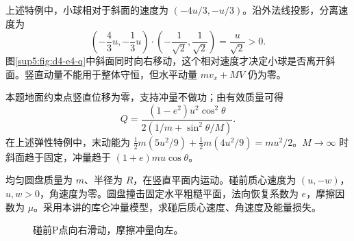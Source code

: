 \begin{solution}
上述特例中，小球相对于斜面的速度为 $(-4u/3,-u/3)$。沿外法线投影，分离速度为
\[
\left(-\frac43u,-\frac13u\right)\cdot
\left(-\frac1{\sqrt2},\frac1{\sqrt2}\right)=\frac u{\sqrt2}>0.
\]
图\ref{sup5:fig:d4-e4-q}中斜面同时向右移动，这个相对速度才决定小球是否离开斜面。竖直动量不能用于整体守恒，但水平动量 $mv_x+MV$ 仍为零。

本题地面约束点竖直位移为零，支持冲量不做功；由有效质量可得
\begin{equation}
 Q=\frac{(1-e^2)u^2\cos^2\theta}{2(1/m+\sin^2\theta/M)}.
\end{equation}
在上述弹性特例中，末动能为 $\tfrac12m(5u^2/9)+\tfrac12m(4u^2/9)=mu^2/2$。$M\to\infty$ 时斜面趋于固定，冲量趋于 $(1+e)mu\cos\theta$。
\end{solution}



\begin{example}[滑动终止的冲量条件]\label{sup5:problem-example-9}
均匀圆盘质量为 $m$、半径为 $R$，在竖直平面内运动。碰前质心速度为 $(u,-w)$，$u,w>0$，角速度为零。圆盘撞击固定水平粗糙平面，法向恢复系数为 $e$，摩擦因数为 $\mu$。采用本讲的库仑冲量模型，求碰后质心速度、角速度及能量损失。
\end{example}
\begin{figure}[H]\centering
{}
\caption{碰前P点向右滑动，摩擦冲量向左。}\label{sup5:fig:d4-e9-q}
\end{figure}
